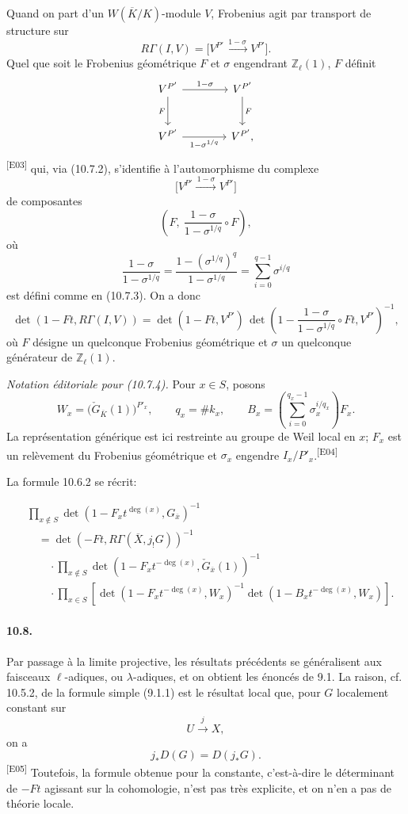 \documentclass[10pt,letterpaper]{article}
\newcommand{\Z}{\mathbb Z}
\newcommand{\auditmark}[1]{\textsuperscript{\normalfont\scriptsize[E#1]}}
\begin{document}
\begin{enumerate}[label=(\alph*)]
Quand on part d'un \(W(\overline K/K)\)-module \(V\), Frobenius agit par transport de structure sur
\[
R\Gamma(I,V)=
\bigl[V^{P'}\xrightarrow{\,1-\sigma\,}V^{P'}\bigr].
\]
Quel que soit le Frobenius géométrique \(F\) et \(\sigma\) engendrant \(\Z_\ell(1)\), \(F\) définit
\[
\begin{tikzcd}[column sep=4.0em,row sep=2.6em]
V^{P'}\arrow[r,"1-\sigma"]\arrow[d,"F"']&
V^{P'}\arrow[d,"F"]\\
V^{P'}\arrow[r,"1-\sigma^{1/q}"']&
V^{P'},
\end{tikzcd}
\]
\auditmark{03}
qui, via (10.7.2), s'identifie à l'automorphisme du complexe
\[
\bigl[V^{P'}\xrightarrow{\,1-\sigma\,}V^{P'}\bigr]
\]
de composantes
\[
\left(F,\ \frac{1-\sigma}{1-\sigma^{1/q}}\circ F\right),
\]
où
\[
\frac{1-\sigma}{1-\sigma^{1/q}}
=
\frac{1-(\sigma^{1/q})^q}{1-\sigma^{1/q}}=\sum_{i=0}^{q-1}\sigma^{i/q}
\]
est défini comme en (10.7.3). On a donc
\[
\det(1-Ft,R\Gamma(I,V))
=
\det(1-Ft,V^{P'})\,
\det\!\left(1-\frac{1-\sigma}{1-\sigma^{1/q}}\circ Ft,V^{P'}\right)^{-1},
\]
où \(F\) désigne un quelconque Frobenius géométrique et \(\sigma\) un quelconque générateur de \(\Z_\ell(1)\).

\par\smallskip\noindent\textit{Notation éditoriale pour (10.7.4).} Pour \(x\in S\), posons
\[
W_x=\bigl(\check G_{\overline K}(1)\bigr)^{P'_x},\qquad
q_x=\#k_x,\qquad
B_x=\left(\sum_{i=0}^{q_x-1}\sigma_x^{i/q_x}\right)F_x.
\]
La représentation générique est ici restreinte au groupe de Weil local en \(x\);
\(F_x\) est un relèvement du Frobenius géométrique et \(\sigma_x\) engendre
\(I_x/P'_x\).\auditmark{04}

La formule 10.6.2 se récrit:

\[
\tag{10.7.4}
\begin{aligned}
&\prod_{x\notin S}\det(1-F_xt^{\deg(x)},G_{\overline x})^{-1}
\\
&\quad=\det(-Ft,R\Gamma(\overline X,j_!G))^{-1}
\\
&\qquad\cdot\prod_{x\notin S}
\det(1-F_xt^{-\deg(x)},\check G_{\overline x}(1))^{-1}
\\
&\qquad\cdot\prod_{x\in S}
\left[\det(1-F_xt^{-\deg(x)},W_x)^{-1}
\det(1-B_xt^{-\deg(x)},W_x)\right].
\end{aligned}
\]

\end{enumerate}

\paragraph{10.8.} Par passage à la limite projective, les résultats précédents se généralisent aux faisceaux \(\ell\)-adiques, ou \(\lambda\)-adiques, et on obtient les énoncés de 9.1. La raison, cf. 10.5.2, de la formule simple (9.1.1) est le résultat local que, pour \(G\) localement constant sur
\[
U\xrightarrow{j}X,
\]
on a
\[
j_*D(G)=D(j_*G).
\]\auditmark{05}
Toutefois, la formule obtenue pour la constante, c'est-à-dire le déterminant de \(-Ft\) agissant sur la cohomologie, n'est pas très explicite, et on n'en a pas de théorie locale.
\end{document}
